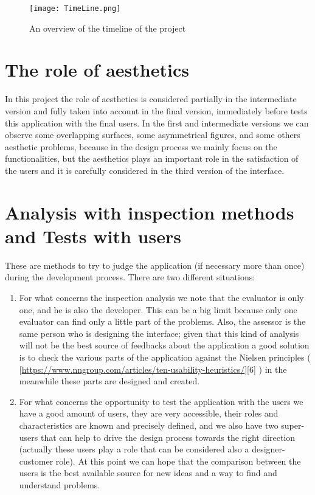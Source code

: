 \begin{figure}[H]
\centering
\texttt{[image: TimeLine.png]} 
\caption{An overview of the timeline of the project}
\end{figure}


\section{The role of aesthetics} 
In this project the role of aesthetics is considered partially in the intermediate version and fully taken into account in the final version, immediately before tests this application with the final users.
In the first and intermediate versions we can observe some overlapping surfaces, some asymmetrical figures, and some others aesthetic problems, because in the design process we mainly focus on the functionalities, but the aesthetics plays an important role in the satisfaction of the users and it is carefully considered in the third version of the interface.  

\section{Analysis with inspection methods and Tests with users}
These are methods to try to judge the application (if necessary more than once) during the development process. There are two different situations:

\begin{enumerate}

\item For what concerns the inspection analysis we note that the evaluator is only one, and he is also the developer. This can be a big limit because only one evaluator can find only a little part of the problems. Also, the assessor is the same person who is designing the interface; given that this kind of analysis will not be the best source of feedbacks about the application a good solution is to check the various parts of the application against the Nielsen principles ( [\url{https://www.nngroup.com/articles/ten-usability-heuristics/}][6] ) in the meanwhile these parts are designed and created.

\item For what concerns the opportunity to test the application with the users we have a good amount of users, they are very accessible, their roles and characteristics are known and precisely defined, and we also have two super-users that can help to drive the design process towards the right direction (actually these users play a role that can be considered also a designer-customer role). At this point we can hope that the comparison between the users is the best available source for new ideas and a way to find and understand problems.    

\end{enumerate}

